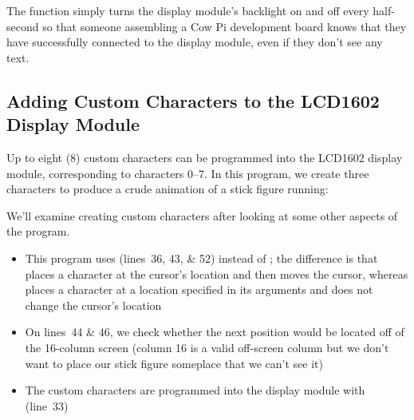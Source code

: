 {    The  function simply turns the display module's backlight on and off every half-second so that someone assembling a Cow Pi development board knows that they have successfully connected to the display module, even if they don't see any text.

\subsection{Adding Custom Characters to the LCD1602 Display Module} \label{subsec:CustomCharacters}

    Up to eight (8) custom characters can be programmed into the LCD1602 display module, corresponding to characters 0--7.
    In this program, we create three characters to produce a crude animation of a stick figure running:

    

    We'll examine creating custom characters after looking at some other aspects of the program.
    \begin{itemize}
        \item This program uses \hyperlink{function:cowpi_lcd1602_place_character}{} (lines~36, 43, \& 52) instead of ;
            the difference is that  places a character at the cursor's location and then moves the cursor, whereas  places a character at a location specified in its arguments and does not change the cursor's location
        \item On lines~44 \& 46, we check whether the next position would be located off of the 16-column screen (column 16 is a valid off-screen column but we don't want to place our stick figure someplace that we can't see it)
        \item The custom characters are programmed into the display module with \hyperlink{function:cowpi_lcd1602_create_character}{} (line~33)
    \end{itemize}

}
